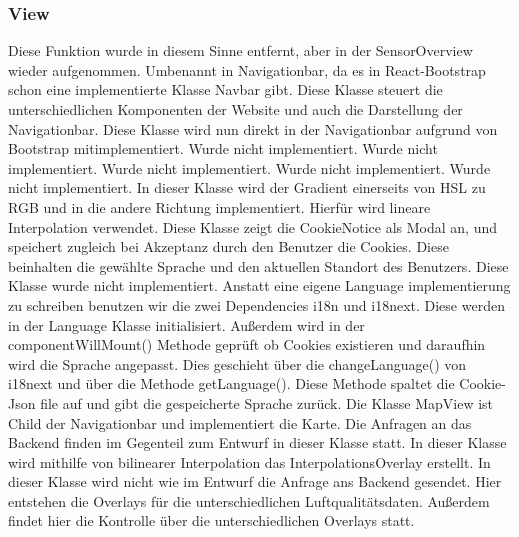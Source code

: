 \subsubsection{View}
    Diese Funktion wurde in diesem Sinne entfernt, aber in der SensorOverview wieder aufgenommen.
    Umbenannt in Navigationbar, da es in React-\gls{Bootstrap} schon eine implementierte Klasse Navbar gibt.
    Diese Klasse steuert die unterschiedlichen Komponenten der Website und auch die Darstellung der Navigationbar.
    \removedClass
    Diese Klasse wird nun direkt in der Navigationbar aufgrund von \gls{Bootstrap} mitimplementiert.
    \removedClass
{}
    Wurde nicht implementiert. 
Wurde nicht implementiert. 
Wurde nicht implementiert. 
Wurde nicht implementiert. 
Wurde nicht implementiert. 
    In dieser Klasse wird der Gradient einerseits von HSL zu RGB und in die andere Richtung implementiert. Hierfür wird lineare Interpolation verwendet.
    Diese Klasse zeigt die \gls{Cookie}Notice als Modal an, und speichert zugleich bei Akzeptanz durch den Benutzer die \gls{Cookie}s.
    Diese beinhalten die gewählte Sprache und den aktuellen Standort des Benutzers.
    Diese Klasse wurde nicht implementiert.
    Anstatt eine eigene Language implementierung zu schreiben benutzen wir die zwei Dependencies i18n und i18next.
    Diese werden in der Language Klasse initialisiert. 
    Außerdem wird in der componentWillMount() Methode geprüft ob \gls{Cookie}s existieren und daraufhin wird die Sprache angepasst. Dies geschieht über die changeLanguage() von i18next und über die Methode getLanguage().
    Diese Methode spaltet die \gls{Cookie}-Json file auf und gibt die gespeicherte Sprache zurück.
    Die Klasse MapView ist Child der Navigationbar und implementiert die Karte. Die Anfragen an das Backend finden im Gegenteil zum Entwurf in dieser Klasse statt. 
    \removedClass
{}
    In dieser Klasse wird mithilfe von bilinearer Interpolation das InterpolationsOverlay erstellt.
    In dieser Klasse wird nicht wie im Entwurf die Anfrage ans Backend gesendet. Hier entstehen die Overlays für die unterschiedlichen Luftqualitätsdaten.
    Außerdem findet hier die Kontrolle über die unterschiedlichen Overlays statt.
    \removedClass
